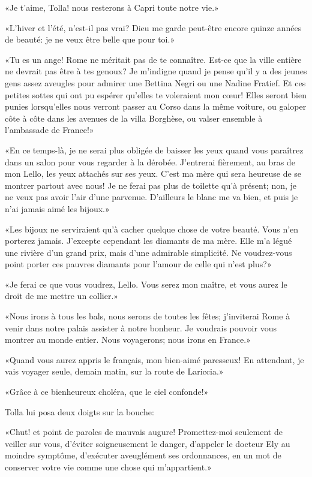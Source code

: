 «Je t'aime, Tolla! nous resterons à Capri toute notre vie.»

«L'hiver et l'été, n'est-il pas vrai? Dieu me garde peut-être encore
quinze années de beauté: je ne veux être belle que pour toi.»

«Tu es un ange! Rome ne méritait pas de te connaître. Est-ce que la
ville entière ne devrait pas être à tes genoux? Je m'indigne quand je
pense qu'il y a des jeunes gens assez aveugles pour admirer une Bettina
Negri ou une Nadine Fratief. Et ces petites sottes qui ont pu espérer
qu'elles te voleraient mon cœur! Elles seront bien punies lorsqu'elles
nous verront passer au Corso dans la même voiture, ou galoper côte à
côte dans les avenues de la villa Borghèse, ou valser ensemble à
l'ambassade de France!»

«En ce temps-là, je ne serai plus obligée de baisser les yeux quand vous
paraîtrez dans un salon pour vous regarder à la dérobée. J'entrerai
fièrement, au bras de mon Lello, les yeux attachés sur ses yeux. C'est
ma mère qui sera heureuse de se montrer partout avec nous! Je ne ferai
pas plus de toilette qu'à présent; non, je ne veux pas avoir l'air d'une
parvenue. D'ailleurs le blanc me va bien, et puis je n'ai jamais aimé
les bijoux.»

«Les bijoux ne serviraient qu'à cacher quelque chose de votre beauté.
Vous n'en porterez jamais. J'excepte cependant les diamants de ma mère.
Elle m'a légué une rivière d'un grand prix, mais d'une admirable
simplicité. Ne voudrez-vous point porter ces pauvres diamants pour
l'amour de celle qui n'est plus?»

«Je ferai ce que vous voudrez, Lello. Vous serez mon maître, et vous
aurez le droit de me mettre un collier.»

«Nous irons à tous les bals, nous serons de toutes les fêtes;
j'inviterai Rome à venir dans notre palais assister à notre bonheur. Je
voudrais pouvoir vous montrer au monde entier. Nous voyagerons; nous
irons en France.»

«Quand vous aurez appris le français, mon bien-aimé paresseux! En
attendant, je vais voyager seule, demain matin, sur la route de
Lariccia.»

«Grâce à ce bienheureux choléra, que le ciel confonde!»

Tolla lui posa deux doigts sur la bouche:

«Chut! et point de paroles de mauvais augure! Promettez-moi seulement de
veiller sur vous, d'éviter soigneusement le danger, d'appeler le docteur
Ely au moindre symptôme, d'exécuter aveuglément ses ordonnances, en un
mot de conserver votre vie comme une chose qui m'appartient.»

